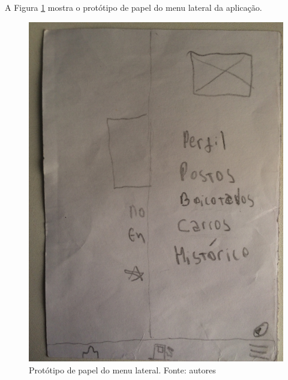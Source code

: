 A Figura \ref{img:prototipo_de_papel_menu_lateral} mostra o protótipo de papel do menu lateral da aplicação.
\begin{figure}[H]
    \centering
    \includegraphics[scale=0.1, angle=-90]{figuras/prototipo_papel_menu.jpg}
    \caption[Protótipo de papel do menu lateral]{Protótipo de papel do menu lateral. Fonte: autores}
    \label{img:prototipo_de_papel_menu_lateral}
\end{figure}
 \pagebreak


